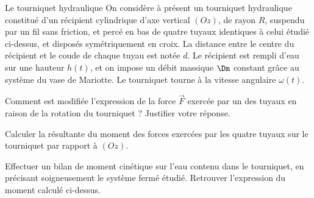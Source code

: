 \begin{exo}[PC][3][TD]{Le tourniquet hydraulique}
On considère à présent un tourniquet hydraulique constitué d'un récipient cylindrique d'axe vertical $(Oz)$, de rayon $R$, suspendu par un fil sans friction, et percé en bas de quatre tuyaux identiques à celui étudié ci-dessus, et disposés symétriquement en croix. La distance entre le centre du récipient et le coude de chaque tuyau est notée $d$. Le récipient est rempli d'eau sur une hauteur $h(t)$, et on impose un débit massique $\Dm$ constant grâce au système du vase de Mariotte.
Le tourniquet tourne à la vitesse angulaire $\omega(t)$.
\begin{quest}
	\item Comment est modifiée l'expression de la force $\Vec{F}$ exercée par un des tuyaux en raison de la rotation du tourniquet ? Justifier votre réponse.
	\item Calculer la résultante du moment des forces exercées par les quatre tuyaux sur le tourniquet par rapport à  $(Oz)$. 
	\item Effectuer un bilan de moment cinétique sur l'eau contenu dans le tourniquet, en précisant soigneusement le système fermé étudié. Retrouver l'expression du  moment calculé ci-dessus.
\end{quest}
\end{exo}
